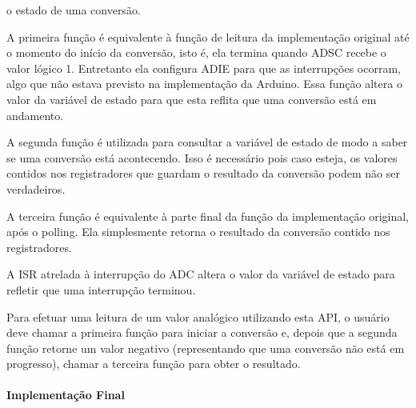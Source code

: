 \documentclass{article}
\begin{document}
o estado de uma conversão.
\par A primeira função é equivalente à função de leitura da implementação original até o momento do
início da conversão, isto é, ela termina quando ADSC recebe o valor lógico 1. Entretanto ela
configura ADIE para que as interrupções ocorram, algo que não estava previsto na implementação
da Arduino. Essa função altera o valor da variável de estado para que esta reflita que uma conversão
está em andamento.
\par A segunda função é utilizada para consultar a variável de estado de modo a saber se uma conversão
está acontecendo. Isso é necessário pois caso esteja, os valores contidos nos registradores que
guardam o resultado da conversão podem não ser verdadeiros.
\par A terceira função é equivalente à parte final da função da implementação original, após o polling. Ela
simplesmente retorna o resultado da conversão contido nos registradores.
\par A ISR atrelada à interrupção do ADC altera o valor da variável de estado para refletir que uma
interrupção terminou.
\par Para efetuar uma leitura de um valor analógico utilizando esta API, o usuário deve chamar a primeira
função para iniciar a conversão e, depois que a segunda função retorne um valor negativo
(representando que uma conversão não está em progresso), chamar a terceira função para obter o
resultado.

\paragraph{Implementação Final}
\end{document}
